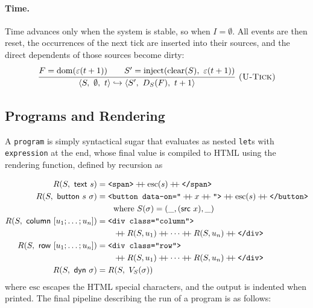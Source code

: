 \documentclass{article}
\makeatletter
\newcommand{\kw}[1]{\mathsf{#1}}
\newcommand{\cfg}[3]{\langle #1,\ #2,\ #3\rangle}
\newcommand{\ustep}{\hookrightarrow}
\newcommand{\cat}{\mathbin{+\!\!+}}
\newcommand{\rul}[3]{\[\dfrac{\begin{array}{@{}c@{}}#2\end{array}}{\begin{array}{@{}c@{}}#3\end{array}}\ \textsc{#1}\]}
\makeatother
\begin{document}
\paragraph{Time.}
Time advances only when the system is stable, so when $I = \emptyset$. All events are then reset, the occurrences of the next tick are inserted into their sources, and the direct dependents of those sources become dirty:
\rul{(U-Tick)}{F = \mathrm{dom}(\varepsilon(t+1)) \qquad S' = \mathrm{inject}(\mathrm{clear}(S),\ \varepsilon(t+1))}
{\cfg{S}{\emptyset}{t} \ustep \cfg{S'}{D_S(F)}{t+1}}

\subsection{Programs and Rendering}

A \texttt{program} is simply syntactical sugar that evaluates as nested \texttt{let}s with \texttt{expression} at the end, whose final value is compiled to HTML using the rendering function, defined by recursion as


\begin{align*}
R(S,\ \kw{text}\ s) &= \texttt{\textless span\textgreater}\cat \mathrm{esc}(s) \cat \texttt{\textless /span\textgreater}\\
R(S,\ \kw{button}\ s\ \sigma) &= \texttt{\textless button data-on="}\cat x \cat \texttt{"\textgreater}\cat \mathrm{esc}(s) \cat \texttt{\textless /button\textgreater}\\ &\qquad\text{where } S(\sigma) = (\_,(\kw{src}\ x),\_)\\
R(S,\ \kw{column}\ [u_1;\dots;u_n]) &= \texttt{\textless div class="column"\textgreater}\\ &\qquad\cat R(S,u_1) \cat \cdots \cat R(S,u_n) \cat \texttt{\textless /div\textgreater}\\
R(S,\ \kw{row}\ [u_1;\dots;u_n]) &= \texttt{\textless div class="row"\textgreater}\\ &\qquad\cat R(S,u_1) \cat \cdots \cat R(S,u_n) \cat \texttt{\textless /div\textgreater}\\
R(S,\ \kw{dyn}\ \sigma) &= R(S,\ V_S(\sigma))
\end{align*}
where $\mathrm{esc}$ escapes the HTML special characters, and the output is indented when printed. The final pipeline describing the run of a program is as follows:
\end{document}
